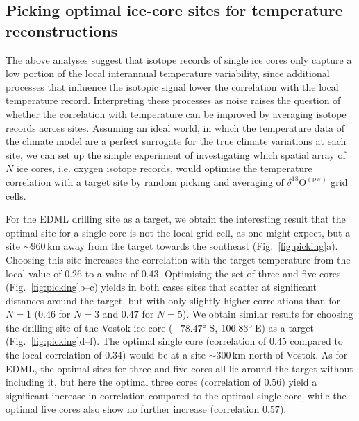 \documentclass[cp, manuscript]{copernicus}
\begin{document}
\subsection{Picking optimal ice-core sites for temperature reconstructions}
\label{results:picking}

The above analyses suggest that isotope records of single ice cores only
capture a low portion of the local interannual temperature variability, since
additional processes that influence the isotopic signal lower the correlation
with the local temperature record. Interpreting these processes as noise raises
the question of whether the correlation with temperature can be improved by
averaging isotope records across sites. Assuming an ideal world, in which the
temperature data of the climate model are a perfect surrogate for the true
climate variations at each site, we can set up the simple experiment of
investigating which spatial array of $N$ ice cores, i.e. oxygen isotope records,
would optimise the temperature correlation with a target site by
random picking and averaging of $\delta^{18}\mathrm{O}^{\mathrm{(pw)}}$ grid
cells.

For the EDML drilling site as a target, we obtain the interesting result that
the optimal site for a single core is not the local grid cell, as one might
expect, but a site $\sim960$\,km away from the target towards the southeast
(Fig.~\ref{fig:picking}a). Choosing this site increases the correlation with the
target temperature from the local value of $0.26$ to a value of
$0.43$. Optimising the set of three and five cores
(Fig.~\ref{fig:picking}b--c) yields in both cases sites that scatter at
significant distances around the target, but with only slightly higher
correlations than for $N=1$ ($0.46$ for $N=3$ and $0.47$ for $N=5$). We obtain
similar results for choosing the drilling site of the Vostok ice core
($-78.47^{\circ}$\,S, $106.83^{\circ}$\,E) as a target
(Fig.~\ref{fig:picking}d--f). The optimal single core (correlation of $0.45$
compared to the local correlation of $0.34$) would be at a site $\sim300$\,km
north of Vostok. As for EDML, the optimal sites for three and five cores all lie
around the target without including it, but here the optimal three cores
(correlation of $0.56$) yield a significant increase in correlation compared to
the optimal single core, while the optimal five cores also show no further
increase (correlation $0.57$).
\end{document}
